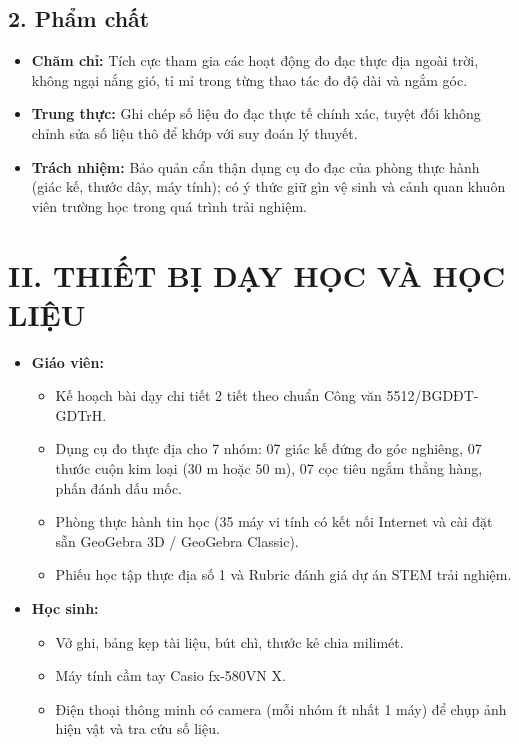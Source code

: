 \documentclass[12pt, a4paper]{article}
\begin{document}
\subsection*{2. Phẩm chất}

\begin{itemize}[leftmargin=1.2cm]
    \item \textbf{Chăm chỉ:} Tích cực tham gia các hoạt động đo đạc thực địa ngoài trời, không ngại nắng gió, tỉ mỉ trong từng thao tác đo độ dài và ngắm góc.
    \item \textbf{Trung thực:} Ghi chép số liệu đo đạc thực tế chính xác, tuyệt đối không chỉnh sửa số liệu thô để khớp với suy đoán lý thuyết.
    \item \textbf{Trách nhiệm:} Bảo quản cẩn thận dụng cụ đo đạc của phòng thực hành (giác kế, thước dây, máy tính); có ý thức giữ gìn vệ sinh và cảnh quan khuôn viên trường học trong quá trình trải nghiệm.
\end{itemize}

\section*{II. THIẾT BỊ DẠY HỌC VÀ HỌC LIỆU}

\begin{itemize}[leftmargin=1.2cm]
    \item \textbf{Giáo viên:}
    \begin{itemize}[leftmargin=0.6cm]
        \item Kế hoạch bài dạy chi tiết 2 tiết theo chuẩn Công văn 5512/BGDĐT-GDTrH.
        \item Dụng cụ đo thực địa cho 7 nhóm: 07 giác kế đứng đo góc nghiêng, 07 thước cuộn kim loại ($30\text{ m}$ hoặc $50\text{ m}$), 07 cọc tiêu ngắm thẳng hàng, phấn đánh dấu mốc.
        \item Phòng thực hành tin học (35 máy vi tính có kết nối Internet và cài đặt sẵn GeoGebra 3D / GeoGebra Classic).
        \item Phiếu học tập thực địa số 1 và Rubric đánh giá dự án STEM trải nghiệm.
    \end{itemize}
    \item \textbf{Học sinh:}
    \begin{itemize}[leftmargin=0.6cm]
        \item Vở ghi, bảng kẹp tài liệu, bút chì, thước kẻ chia milimét.
        \item Máy tính cầm tay Casio fx-580VN X.
        \item Điện thoại thông minh có camera (mỗi nhóm ít nhất 1 máy) để chụp ảnh hiện vật và tra cứu số liệu.
    \end{itemize}
\end{itemize}
\end{document}
